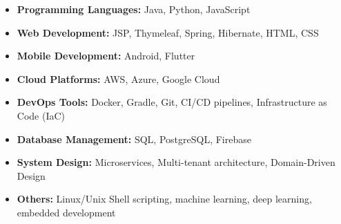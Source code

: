 \documentclass[10pt,a4paper]{article}
\begin{document}
\spacedhrule{0.1em}{-0.8em}
\begin{itemize}
  \item \textbf{Programming Languages:} Java, Python, JavaScript
  \item \textbf{Web Development:} JSP, Thymeleaf, Spring, Hibernate, HTML, CSS 
  \item \textbf{Mobile Development:} Android, Flutter
  \item \textbf{Cloud Platforms:} AWS, Azure, Google Cloud
  \item \textbf{DevOps Tools:} Docker, Gradle, Git, CI/CD pipelines, Infrastructure as Code (IaC)
  \item \textbf{Database Management:} SQL, PostgreSQL, Firebase
  \item \textbf{System Design:} Microservices, Multi-tenant architecture, Domain-Driven Design
  \item \textbf{Others:} Linux/Unix Shell scripting, machine learning, deep learning, embedded development
\end{itemize}


\end{document}
